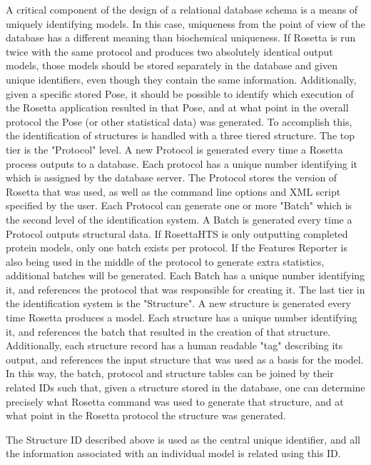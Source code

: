 A critical component of the design of a relational database schema is a means of uniquely identifying models.
In this case, uniqueness from the point of view of the database has a different meaning than biochemical uniqueness.
If Rosetta is run twice with the same protocol and produces two absolutely identical output models, those models should be stored separately in the database and given unique identifiers, even though they contain the same information. 
Additionally, given a specific stored Pose, it should be possible to identify which execution of the Rosetta application resulted in that Pose, and at what point in the overall protocol the Pose (or other statistical data) was generated. 
To accomplish this, the identification of structures is handled with a three tiered structure.
The top tier is the "Protocol" level.
A new Protocol is generated every time a Rosetta process outputs to a database.
Each protocol has a unique number identifying it which is assigned by the database server.
The Protocol stores the version of Rosetta that was used, as well as the command line options and XML script specified by the user.
Each Protocol can generate one or more "Batch" which is the second level of the identification system.
A Batch is generated every time a Protocol outputs structural data. If RosettaHTS is only outputting completed protein models, only one batch exists per protocol.
If the Features Reporter is also being used in the middle of the protocol to generate extra statistics, additional batches will be generated. 
Each Batch has a unique number identifying it, and references the protocol that was responsible for creating it.
The last tier in the identification system is the "Structure".
A new structure is generated every time Rosetta produces a model.
Each structure has a unique number identifying it, and references the batch that resulted in the creation of that structure.
Additionally, each structure record has a human readable "tag" describing its output, and references the input structure that was used as a basis for the model. 
In this way, the batch, protocol and structure tables can be joined by their related IDs such that, given a structure stored in the database, one can determine precisely what Rosetta command was used to generate that structure, and at what point in the Rosetta protocol the structure was generated. 

The Structure ID described above is used as the central unique identifier, and all the information associated with an individual model is related using this ID.

